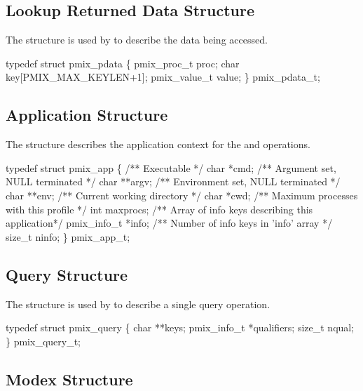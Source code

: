 \subsection{Lookup Returned Data Structure}

The  structure is used by  to describe the data being accessed.

\cspecificstart
\begin{codepar}
typedef struct pmix_pdata \{
    pmix_proc_t proc;
    char key[PMIX_MAX_KEYLEN+1];
    pmix_value_t value;
\} pmix_pdata_t;
\end{codepar}
\cspecificend


\subsection{Application Structure}

The  structure describes the application context for the  and  operations.

\cspecificstart
\begin{codepar}
typedef struct pmix_app \{
    /** Executable */
    char *cmd;
    /** Argument set, NULL terminated */
    char **argv;
    /** Environment set, NULL terminated */
    char **env;
    /** Current working directory */
    char *cwd;
    /** Maximum processes with this profile */
    int maxprocs;
    /** Array of info keys describing this application*/
    pmix_info_t *info;
    /** Number of info keys in 'info' array */
    size_t ninfo;
\} pmix_app_t;
\end{codepar}
\cspecificend


\subsection{Query Structure}

The  structure is used by  to describe a single query operation.

\cspecificstart
\begin{codepar}
typedef struct pmix_query \{
    char **keys;
    pmix_info_t *qualifiers;
    size_t nqual;
\} pmix_query_t;
\end{codepar}
\cspecificend


\subsection{Modex Structure}

